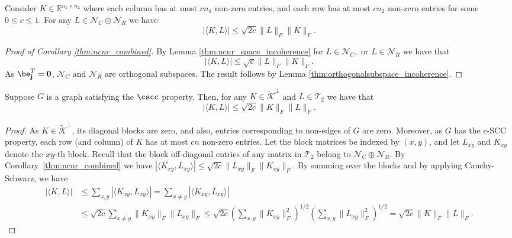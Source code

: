 \begin{corollary} \label{thm:ncnr_combined}
Consider   $K \in \mathbb{R}^{n_1\times n_2}$ where  each column has at most $c n_1$ non-zero entries, and each row has at most $c n_2$ non-zero entries for some  $0 \leq c \leq 1$.  For any  $L \in \mathcal{N}_{C}\oplus \mathcal{N}_{R}$  we have: 
$$| \langle K, L \rangle | \leq \sqrt{2c} \| L \|_F \| K \|_F.$$
\end{corollary}

\begin{proof} [Proof of Corollary \ref{thm:ncnr_combined}]
 By Lemma \ref{thm:ncnr_space_incoherence} for  $ L \in \mathcal{N}_C,$ or $ L\in  \mathcal{N}_R$ we have that
$$| \langle K, L \rangle | \leq \sqrt{c} \| L \|_F \| K \|_F.$$
As $\be^T \bf_j=0$,  $\mathcal{N}_{C}$ and $\mathcal{N}_{R}$ are orthogonal subspaces. 
The result follows by Lemma \ref{thm:orthogonalsubspace_incoherence}.
\end{proof}

\begin{lemma} \label{thm:incoherence_efsum}
Suppose $G$ is a graph satisfying the $\cscc$ property.  %
Then, for any  $K \in \tilde{\mathcal{K}}^\perp$ and $L\in \mathcal{T}_2$ we  have that
$$| \langle K,L \rangle| \leq \sqrt{2c} \|K\|_F \|L\|_F.$$
\end{lemma}

\begin{proof} As $K \in \tilde{\mathcal{K}}^\perp$, its diagonal blocks are zero, and  also, entries corresponding to non-edges of $G$ are zero.  Moreover, as $G$ has the   $c$-SCC property, each  row (and column) of $K$  has at most $cn$ non-zero entries.
Let the block matrices be indexed by $(x,y)$, and let $L_{xy}$ and $K_{xy}$ denote the $xy$-th block.  Recall that  the block off-diagonal entries of any matrix in  $\mathcal{T}_{2}$ belong to %
$ \mathcal{N}_{C} \oplus \mathcal{N}_{R}.$ By Corollary~\ref{thm:ncnr_combined} we have $| \langle K_{xy}, L_{xy} \rangle | \leq \sqrt{2c} \| L_{xy} \|_F \| K_{xy} \|_F$.  By summing over the blocks and by applying Cauchy-Schwarz, we have 
$$
 \begin{aligned}
  | \langle K , L \rangle | &  \leq \sum_{x,y} |\langle K_{xy} , L_{xy} \rangle |= \sum_{x\ne  y} |\langle K_{xy} , L_{xy} \rangle | \\
& \leq \sqrt{2c} \sum_{x\ne y} \| K_{xy} \|_F \| L_{xy} \|_F \leq \sqrt{2c} (\sum_{x,y} \| K_{xy} \|_F^2)^{1/2} (\sum_{x,y} \| L_{xy} \|_F^2)^{1/2} = \sqrt{2c} \| K \|_F \| L \|_F.
\end{aligned} $$
\end{proof}


